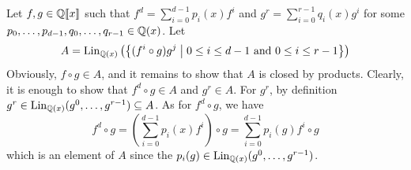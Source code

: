 \begin{solution}
\begin{enumerate}
            Let $f, g \in \mathbb Q[\![x]\!]$ such that $f^d =
            \sum_{i = 0}^{d-1} p_i(x) f^i$ and $ g^r = \sum_{i =
            0}^{r-1} q_i(x) g^i$ for some $p_0, \dots, p_{d-1}, q_0,
            \dots, q_{r-1} \in \mathbb Q(x)$.
            Let
            \[
                A = \lin[\rat{\Q}{x}]\left( \setof{(f^i \circ g)g^j}{0 \leq
                i \leq d-1 \text{ and } 0 \leq i \leq r-1} \right)
            \]
            Obviously, $f \circ g \in A$, and it remains to show that
            $A$ is closed by products.
            Clearly, it is enough to show that $f^d \circ g \in A$
            and $g^r \in A$.
            For $g^r$, by definition $g^r \in \lin[\rat{\Q}{x}](g^0,
            \dots, g^{r-1}) \subseteq A$.
            As for $f^d \circ g$, we have
            \[
                f^d \circ g
                = \left(\sum_{i = 0}^{d-1} p_i(x) f^i\right) \circ g
                = \sum_{i = 0}^{d-1} p_i(g) f^i \circ g
            \]
            which is an element of $A$ since the $p_i(g) \in
            \lin[\rat{\Q}{x}](g^0,
            \dots, g^{r-1})$.
    \end{enumerate}
\end{solution}

